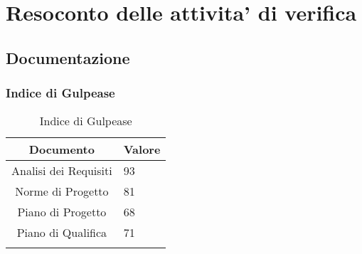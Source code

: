 \section{Resoconto delle attivita' di verifica}

\subsection{Documentazione}

\subsubsection{Indice di Gulpease}

\begin{table}[H]
	\centering
	\renewcommand\tabularxcolumn[1]{>{\Centering}m{#1}}
	\begin{tabularx}{\textwidth}{| c | X |} 
	\hline
	\textbf{Documento} & \textbf{Valore}\\
	\hline
	Analisi dei Requisiti & 93 \\
     	\hline
	Norme di Progetto & 81\\
	\hline
	Piano di Progetto & 68\\
	\hline
	Piano di Qualifica & 71\\
	\hline
    	\caption{Indice di Gulpease}
	\end{tabularx}
\end{table}
